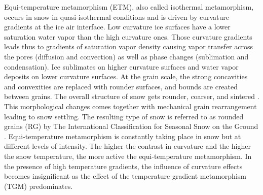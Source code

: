 \documentclass[draft,ms]{agujournal2019}
\begin{document}
Equi-temperature metamorphism (ETM), also called isothermal metamorphism, occurs in snow in quasi-isothermal conditions and is driven by curvature gradients at the ice air interface. Low curvature ice surfaces have a lower saturation water vapor than the high curvature ones. Those curvature gradients leads thus to gradients of saturation vapor density causing vapor transfer across the pores (diffusion and convection) as well as phase changes (sublimation and condensation). Ice sublimates on higher curvature surfaces and  water vapor deposits on lower curvature surfaces. At the grain scale, the strong concavities and convexities are replaced with rounder surfaces, and bounds are created between grains. The overall structure of snow gets rounder, coarser, and sintered \cite{colbeck_thermodynamics_1980}. This morphological changes comes together with mechanical grain rearrangement leading to snow settling. The resulting type of snow is referred to as rounded grains (RG) by The International Classification for Seasonal Snow on the Ground \cite{fierz2009international}. Equi-temperature metamorphism is constantly taking place in snow but at different levels of intensity. The higher the contrast in curvature and the higher the snow temperature, the more active the equi-temperature metamorphism. In the presence of high temperature gradients, the influence of curvature effects becomes insignificant as the effect of the temperature gradient metamorphism (TGM) predominates.\\
\end{document}
